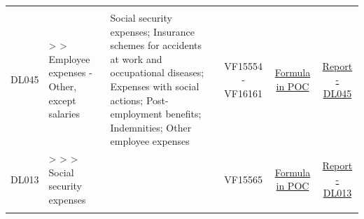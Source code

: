 \documentclass[]{book}
\begin{document}
\begin{longtable}[]{@{}cllccc@{}}
\begin{minipage}[t]{0.16\columnwidth}
\end{minipage}\tabularnewline
\begin{minipage}[t]{0.08\columnwidth}\centering
DL045\strut
\end{minipage} & \begin{minipage}[t]{0.20\columnwidth}\raggedright
\textgreater{} \textgreater{} Employee expenses - Other, except salaries\strut
\end{minipage} & \begin{minipage}[t]{0.16\columnwidth}\raggedright
Social security expenses; Insurance schemes for accidents at work and occupational diseases; Expenses with social actions; Post-employment benefits; Indemnities; Other employee expenses\strut
\end{minipage} & \begin{minipage}[t]{0.09\columnwidth}\centering
VF15554 - VF16161\strut
\end{minipage} & \begin{minipage}[t]{0.15\columnwidth}\centering
\protect\hyperlink{dl045---formula-in-poc}{Formula in POC}\strut
\end{minipage} & \begin{minipage}[t]{0.16\columnwidth}\centering
\href{./Auxiliary\%20Files/technical_reports/variable_report/DL045(!).pdf}{Report - DL045}\strut
\end{minipage}\tabularnewline
\begin{minipage}[t]{0.08\columnwidth}\centering
DL013\strut
\end{minipage} & \begin{minipage}[t]{0.20\columnwidth}\raggedright
\textgreater{} \textgreater{} \textgreater{} Social security expenses\strut
\end{minipage} & \begin{minipage}[t]{0.16\columnwidth}\raggedright
\strut
\end{minipage} & \begin{minipage}[t]{0.09\columnwidth}\centering
VF15565\strut
\end{minipage} & \begin{minipage}[t]{0.15\columnwidth}\centering
\protect\hyperlink{dl013---formula-in-poc}{Formula in POC}\strut
\end{minipage} & \begin{minipage}[t]{0.16\columnwidth}\centering
\href{./Auxiliary\%20Files/technical_reports/variable_report/DL013.pdf}{Report - DL013}\strut
\end{minipage}\tabularnewline
\begin{minipage}[t]{0.08\columnwidth}\centering

\end{minipage}
\end{longtable}
\end{document}
